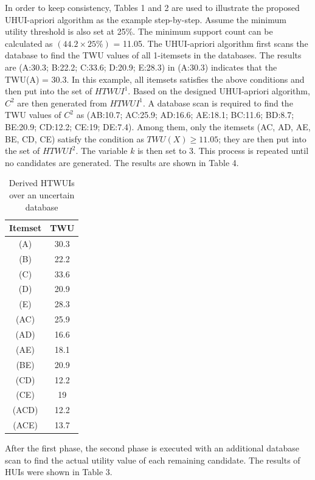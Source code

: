 \documentclass[conference]{IEEEtran}
\begin{document}
In order to keep consistency, Tables 1 and 2 are used to illustrate the proposed UHUI-apriori algorithm as the example step-by-step. Assume the minimum utility threshold is also set at 25\%. The minimum support count can be calculated as $(44.2 \times 25\%)$ = 11.05. The UHUI-apriori algorithm first scans the database to find the TWU values of all 1-itemsets in the databases. The results are (A:30.3; B:22.2; C:33.6; D:20.9; E:28.3) in (A:30.3) indicates that the TWU(A) = 30.3. In this example, all itemsets satisfies the above conditions and then put into the set of $HTWUI^1$. Based on the designed UHUI-apriori algorithm, $C^2$ are then generated from $HTWUI^1$. A database scan is required to find the TWU values of $C^2$ as (AB:10.7; AC:25.9; AD:16.6; AE:18.1; BC:11.6; BD:8.7; BE:20.9; CD:12.2; CE:19; DE:7.4). Among them, only the itemsets (AC, AD, AE, BE, CD, CE) satisfy the condition as $TWU(X) \geq 11.05$; they are then put into the set of $HTWUI^2$. The variable $k$ is then set to 3. This process is repeated until no candidates are generated. The results are shown in Table 4.

\begin{table}
  \centering
  \caption{Derived HTWUIs over an uncertain database}
  \label{tab:HTHUIs}
  \begin{tabular}{|c|c|}\hline
  \bfseries Itemset & \bfseries TWU \\ \hline
  (A) & 30.3 \\ \hline
  (B) & 22.2 \\ \hline
  (C) & 33.6 \\ \hline
  (D) & 20.9 \\ \hline
  (E) & 28.3 \\ \hline
  (AC) & 25.9 \\ \hline
  (AD) & 16.6 \\ \hline
  (AE) & 18.1 \\ \hline
  (BE) & 20.9 \\ \hline
  (CD) & 12.2 \\ \hline
  (CE) & 19 \\ \hline
  (ACD) & 12.2 \\ \hline
  (ACE) & 13.7 \\ \hline
  \end{tabular}
\end{table}

After the first phase, the second phase is executed with an additional database scan to find the actual utility value of each remaining candidate. The results of HUIs were shown in Table 3.
\end{document}
